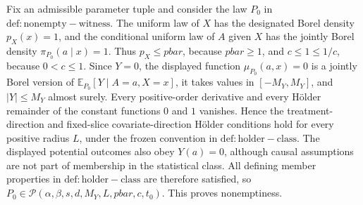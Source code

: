 Fix an admissible parameter tuple and consider the law \(P_0\) in \(\mathrm{def:nonempty-witness}\).  The uniform law of \(X\) has the designated Borel density \(p_X(x)=1\), and the conditional uniform law of \(A\) given \(X\) has the jointly Borel density \(\pi_{P_0}(a\mid x)=1\).  Thus \(p_X\le pbar\), because \(pbar\ge1\), and \(c\le1\le1/c\), because \(0<c\le1\).  Since \(Y=0\), the displayed function \(\mu_{P_0}(a,x)=0\) is a jointly Borel version of \(\mathbb E_{P_0}[Y\mid A=a,X=x]\), it takes values in \([-M_Y,M_Y]\), and \(|Y|\le M_Y\) almost surely.  Every positive-order derivative and every Hölder remainder of the constant functions \(0\) and \(1\) vanishes.  Hence the treatment-direction and fixed-slice covariate-direction Hölder conditions hold for every positive radius \(L\), under the frozen convention in \(\mathrm{def:holder-class}\).  The displayed potential outcomes also obey \(Y(a)=0\), although causal assumptions are not part of membership in the statistical class.  All defining member properties in \(\mathrm{def:holder-class}\) are therefore satisfied, so \(P_0\in\mathcal P(\alpha,\beta,s,d,M_Y,L,pbar,c,t_0)\).  This proves nonemptiness.